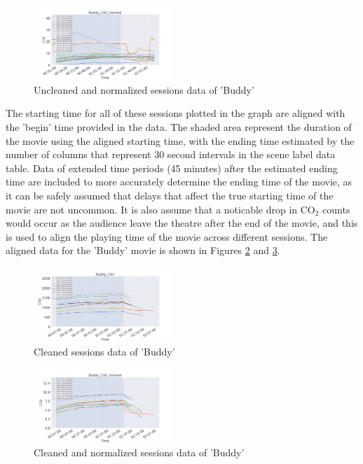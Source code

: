 \documentclass[letterpaper, 10 pt, conference]{ieeeconf}  %
\begin{document}
\begin{figure}[thpb]
  \centering
  \includegraphics[width=0.47\textwidth]{../Plots/uncleanedCO2/Buddy_CO2_normed.png}
  \caption{Uncleaned and normalized sessions data of 'Buddy'}
  \label{BuddyUncleanedNormed}
\end{figure}

The starting time for all of these sessions plotted in the graph are aligned with the 'begin' time provided in the data. The shaded area represent the duration of the movie using the aligned starting time, with the ending time estimated by the number of columns that represent 30 second intervals in the scene label data table. Data of extended time periods (45 minutes) after the estimated ending time are included to more accurately determine the ending time of the movie, as it can be safely assumed that delays that affect the true starting time of the movie are not uncommon. It is also assume that a noticable drop in CO$_2$ counts would occur as the audience leave the theatre after the end of the movie, and this is used to align the playing time of the movie across different sessions. The aligned data for the 'Buddy' movie is shown in Figures \ref{BuddyCleaned} and \ref{BuddyCleanedNormed}.

\begin{figure}[thpb]
  \centering
  \includegraphics[width=0.47\textwidth]{../Plots/Buddy_CO2.png}
  \caption{Cleaned sessions data of 'Buddy'}
  \label{BuddyCleaned}
\end{figure}

\begin{figure}[thpb]
  \centering
  \includegraphics[width=0.47\textwidth]{../Plots/Buddy_CO2_normed.png}
  \caption{Cleaned and normalized sessions data of 'Buddy'}
  \label{BuddyCleanedNormed}
\end{figure} 
\end{document}
